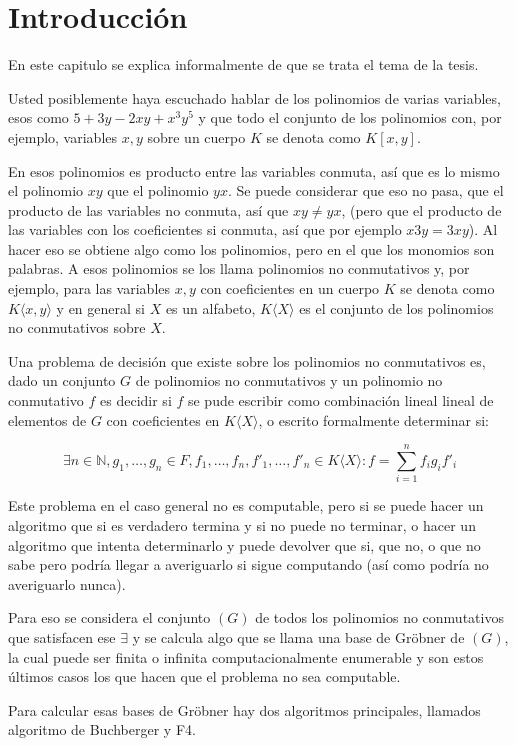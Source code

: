 \documentclass[12pt]{report}
\theoremstyle{customstyle}
\theoremstyle{factstyle}
\begin{document}
\chapter{Introducción}

En este capitulo se explica informalmente de que se trata el tema de la tesis.

Usted posiblemente haya escuchado hablar de los polinomios de varias variables, esos como $5  + 3 y - 2 x y + x^3 y^5$ y que todo el conjunto de los polinomios con, por ejemplo, variables $x, y$ sobre un cuerpo $K$ se denota como $K[x, y]$.

En esos polinomios es producto entre las variables conmuta, así que es lo mismo el polinomio $x y$ que el polinomio $y x$. Se puede considerar que eso no pasa, que el producto de las variables no conmuta, así que $x y ≠ y x$, (pero que el producto de las variables con los coeficientes si conmuta, así que por ejemplo $x 3 y = 3 x y$). Al hacer eso se obtiene algo como los polinomios, pero en el que los monomios son palabras. A esos polinomios se los llama polinomios no conmutativos y, por ejemplo, para las variables $x, y$ con coeficientes en un cuerpo $K$ se denota como $K⟨x, y⟩$ y en general si $X$ es un alfabeto, $K⟨X⟩$ es el conjunto de los polinomios no conmutativos sobre $X$.

Una problema de decisión que existe sobre los polinomios no conmutativos es, dado un conjunto $G$ de polinomios no conmutativos y un polinomio no conmutativo $f$ es decidir si $f$ se pude escribir como combinación lineal lineal de elementos de $G$ con coeficientes en $K⟨X⟩$, o escrito formalmente determinar si:

\[ ∃n ∈ ℕ, g_1, …, g_n ∈ F, f_1, …, f_n, f'_1, …, f'_n ∈ K⟨X⟩ : f = ∑_{i = 1}^n f_i g_i f'_i \]

Este problema en el caso general no es computable, pero si se puede hacer un algoritmo que si es verdadero termina y si no puede no terminar, o hacer un algoritmo que intenta determinarlo y puede devolver que si, que no, o que no sabe pero podría llegar a averiguarlo si sigue computando (así como podría no averiguarlo nunca).

Para eso se considera el conjunto $(G)$ de todos los polinomios no conmutativos que satisfacen ese $∃$ y se calcula algo que se llama una base de Gröbner de $(G)$, la cual puede ser finita o infinita computacionalmente enumerable y son estos últimos casos los que hacen que el problema no sea computable.

Para calcular esas bases de Gröbner hay dos algoritmos principales, llamados algoritmo de Buchberger y F4.
\end{document}

